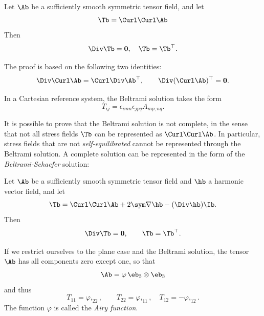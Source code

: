 \begin{definition}
	Let $\Ab$ be a sufficiently smooth symmetric tensor field, and let
	\begin{equation}
		\Tb = \Curl \Curl \Ab
	\end{equation}
	Then 
	\begin{equation}
		\Div \Tb = \mathbf{0}, \quad \Tb = \Tb^\top.
	\end{equation}
\end{definition}

The proof is based on the following two identities:
\begin{equation}
	\Div \Curl \Ab = \Curl \Div \Ab^\top, \qquad \Div(\Curl \Ab)^\top = \mathbf{0}.
\end{equation}

In a Cartesian reference system, the Beltrami solution takes the form
\begin{equation}
	T_{ij} = \epsilon_{imn} \epsilon_{jpq} A_{mp,nq}.
\end{equation}


	It is possible to prove that the Beltrami solution is not complete, in the sense that not all stress fields $\Tb$ can be represented as $\Curl \Curl \Ab$. In particular, stress fields that are not \textit{self-equilibrated} cannot be represented through the Beltrami solution. A complete solution can be represented in the form of the \textit{Beltrami-Schaefer} solution:
	\begin{definition}
		Let $\Ab$ be a sufficiently smooth symmetric tensor field and $\hb$ a harmonic vector field, and let
		\begin{equation}
			\Tb = \Curl \Curl \Ab + 2 \sym \nabla \hb - (\Div \hb) \Ib.
		\end{equation}
		Then
		\begin{equation}
			\Div \Tb = \mathbf{0}, \qquad \Tb = \Tb^\top.
		\end{equation}
	\end{definition}


If we restrict ourselves to the plane case and the Beltrami solution, the tensor $\Ab$ has all components zero except one, so that
	\begin{equation}
		\Ab = \varphi\, \eb_3 \otimes \eb_3
	\end{equation}
	and thus
	\begin{equation}\label{Airy}
		T_{11} = \varphi,_{22}, \qquad T_{22} = \varphi,_{11}, \quad T_{12} = -\varphi,_{12}.
	\end{equation}
	The function $\varphi$ is called the \textit{Airy function}.
	
